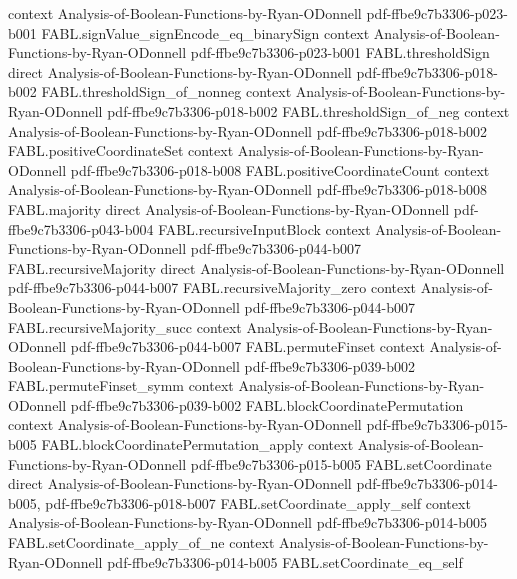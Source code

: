 \begin{theorem}
  {context}
  {Analysis-of-Boolean-Functions-by-Ryan-ODonnell}
  {pdf-ffbe9c7b3306-p023-b001}
\proofstep
  {FABL.signValue_signEncode_eq_binarySign}
  {context}
  {Analysis-of-Boolean-Functions-by-Ryan-ODonnell}
  {pdf-ffbe9c7b3306-p023-b001}
\proofstep
  {FABL.thresholdSign}
  {direct}
  {Analysis-of-Boolean-Functions-by-Ryan-ODonnell}
  {pdf-ffbe9c7b3306-p018-b002}
\proofstep
  {FABL.thresholdSign_of_nonneg}
  {context}
  {Analysis-of-Boolean-Functions-by-Ryan-ODonnell}
  {pdf-ffbe9c7b3306-p018-b002}
\proofstep
  {FABL.thresholdSign_of_neg}
  {context}
  {Analysis-of-Boolean-Functions-by-Ryan-ODonnell}
  {pdf-ffbe9c7b3306-p018-b002}
\proofstep
  {FABL.positiveCoordinateSet}
  {context}
  {Analysis-of-Boolean-Functions-by-Ryan-ODonnell}
  {pdf-ffbe9c7b3306-p018-b008}
\proofstep
  {FABL.positiveCoordinateCount}
  {context}
  {Analysis-of-Boolean-Functions-by-Ryan-ODonnell}
  {pdf-ffbe9c7b3306-p018-b008}
\proofstep
  {FABL.majority}
  {direct}
  {Analysis-of-Boolean-Functions-by-Ryan-ODonnell}
  {pdf-ffbe9c7b3306-p043-b004}
\proofstep
  {FABL.recursiveInputBlock}
  {context}
  {Analysis-of-Boolean-Functions-by-Ryan-ODonnell}
  {pdf-ffbe9c7b3306-p044-b007}
\proofstep
  {FABL.recursiveMajority}
  {direct}
  {Analysis-of-Boolean-Functions-by-Ryan-ODonnell}
  {pdf-ffbe9c7b3306-p044-b007}
\proofstep
  {FABL.recursiveMajority_zero}
  {context}
  {Analysis-of-Boolean-Functions-by-Ryan-ODonnell}
  {pdf-ffbe9c7b3306-p044-b007}
\proofstep
  {FABL.recursiveMajority_succ}
  {context}
  {Analysis-of-Boolean-Functions-by-Ryan-ODonnell}
  {pdf-ffbe9c7b3306-p044-b007}
\proofstep
  {FABL.permuteFinset}
  {context}
  {Analysis-of-Boolean-Functions-by-Ryan-ODonnell}
  {pdf-ffbe9c7b3306-p039-b002}
\proofstep
  {FABL.permuteFinset_symm}
  {context}
  {Analysis-of-Boolean-Functions-by-Ryan-ODonnell}
  {pdf-ffbe9c7b3306-p039-b002}
\proofstep
  {FABL.blockCoordinatePermutation}
  {context}
  {Analysis-of-Boolean-Functions-by-Ryan-ODonnell}
  {pdf-ffbe9c7b3306-p015-b005}
\proofstep
  {FABL.blockCoordinatePermutation_apply}
  {context}
  {Analysis-of-Boolean-Functions-by-Ryan-ODonnell}
  {pdf-ffbe9c7b3306-p015-b005}
\proofstep
  {FABL.setCoordinate}
  {direct}
  {Analysis-of-Boolean-Functions-by-Ryan-ODonnell}
  {pdf-ffbe9c7b3306-p014-b005,
    pdf-ffbe9c7b3306-p018-b007}
\proofstep
  {FABL.setCoordinate_apply_self}
  {context}
  {Analysis-of-Boolean-Functions-by-Ryan-ODonnell}
  {pdf-ffbe9c7b3306-p014-b005}
\proofstep
  {FABL.setCoordinate_apply_of_ne}
  {context}
  {Analysis-of-Boolean-Functions-by-Ryan-ODonnell}
  {pdf-ffbe9c7b3306-p014-b005}
\proofstep
  {FABL.setCoordinate_eq_self}

\end{theorem}
